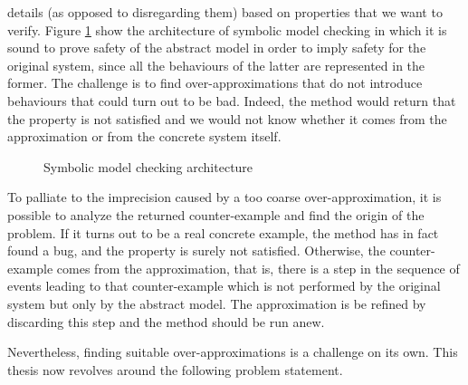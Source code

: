 details (as opposed to disregarding them) based on properties that we want to verify. Figure \ref{symbolicmodelchecking} show the architecture of symbolic model checking in which it is sound to prove safety of the abstract model in order to imply
safety for the original system, since all the behaviours of the latter
are represented in the former. %
%
The challenge is to find over-approximations that do not introduce
behaviours that could turn out to be bad. Indeed, the method would
return that the property is not satisfied and we would not know
whether it comes from the approximation or from the concrete system
itself. %



\vspace{1cm}
\begin{figure}[h]
  \centering
  \vspace{0.3cm}
\caption{Symbolic model checking architecture }	
\label{symbolicmodelchecking}
\end{figure}
\vspace{1cm}

To palliate to the imprecision caused by a too coarse
over-approximation, it is possible to analyze the returned
counter-example and find the origin of the problem. If it turns out to
be a real concrete example, the method has in fact found a bug, and
the property is surely not satisfied. Otherwise, the counter-example
comes from the approximation, that is, there is a step in the sequence
of events leading to that counter-example which is not performed by
the original system but only by the abstract model. The approximation
is be refined by discarding this step and the method should be run
anew.

Nevertheless, finding suitable over-approximations is a challenge on
its own. %
This thesis now revolves around the following problem statement.
%
%

